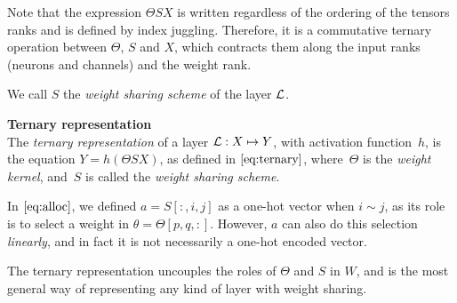 
\begin{remark}
Note that the expression $\Theta S X$ is written regardless of the ordering of the tensors ranks and is defined by index juggling. Therefore, it is a commutative ternary operation between $\Theta$, $S$  and $X$, which contracts them along the input ranks (neurons and channels) and the weight rank.
\end{remark}

We call $S$ the \emph{weight sharing scheme} of the layer $\mathcal{L}$.

\begin{definition}\textbf{Ternary representation}\\
The \emph{ternary representation} of a layer $\mathcal{L}: X \mapsto Y$, with activation function~$h$, is the equation $Y = h\left(\Theta S X\right)$, as defined in $\eqref{eq:ternary}$, where~$\Theta$ is the \emph{weight kernel}, and~$S$ is called the \emph{weight sharing scheme}.
\end{definition}

\begin{remark}
In $\eqref{eq:alloc}$, we defined $a = S[:,i,j]$ as a one-hot vector when $i \sim j$, as its role is to select a weight in $\theta = \Theta[p,q,:]$. However, $a$ can also do this selection \emph{linearly}, and in fact it is not necessarily a one-hot encoded vector.
\end{remark}

The ternary representation uncouples the roles of $\Theta$ and $S$ in $W$, and is the most general way of representing any kind of layer with weight sharing.
